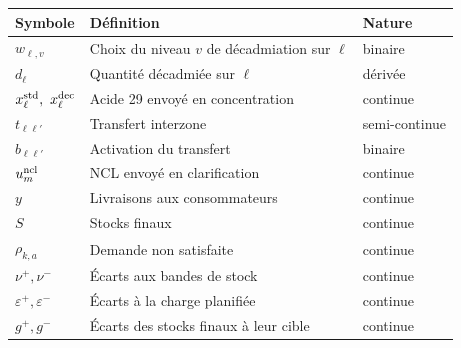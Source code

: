 \begin{longtable}{@{}lll@{}}
\toprule
\textbf{Symbole} & \textbf{Définition} & \textbf{Nature} \\
\midrule
\endhead
$w_{\ell,v}$ & Choix du niveau $v$ de décadmiation sur $\ell$ & binaire \\
$d_\ell$ & Quantité décadmiée sur $\ell$ & dérivée \\
$\xstd_\ell,\ \xdec_\ell$ & Acide 29 envoyé en concentration & continue \\
$t_{\ell\ell'}$ & Transfert interzone & semi-continue \\
$b_{\ell\ell'}$ & Activation du transfert & binaire \\
$u^{\mathrm{ncl}}_m$ & NCL envoyé en clarification & continue \\
$y$ & Livraisons aux consommateurs & continue \\
$S$ & Stocks finaux & continue \\
$\rho_{k,a}$ & Demande non satisfaite & continue \\
$\nu^{+}, \nu^{-}$ & Écarts aux bandes de stock & continue \\
$\varepsilon^{+}, \varepsilon^{-}$ & Écarts à la charge planifiée & continue \\
$g^{+}, g^{-}$ & Écarts des stocks finaux à leur cible & continue \\
\bottomrule
\end{longtable}

\cleardoublepage
